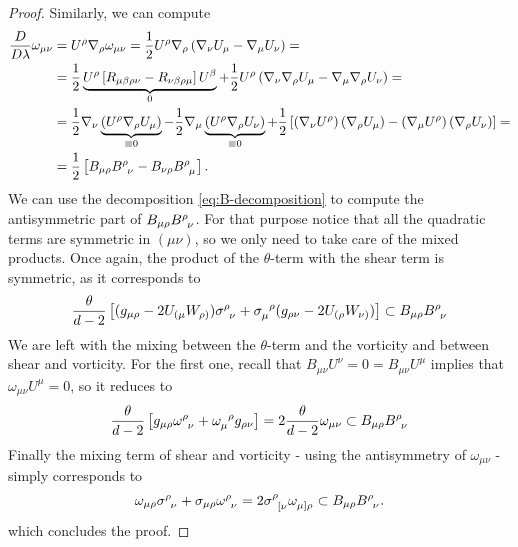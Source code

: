 \begin{proof}
		Similarly, we can compute
		\begin{align*}
			\frac{D}{D\lambda}\omega_{\mu\nu} &= U^{\rho}\nabla_{\rho}\omega_{\mu\nu} = \frac{1}{2}U^{\rho}\nabla_{\rho}\left( \nabla_{\nu}U_{\mu} - \nabla_{\mu}U_{\nu} \right) = \\
		&= \frac{1}{2}\underbrace{U^{\rho} \left[R_{\mu\beta\rho\nu} - R_{\nu\beta\rho\mu}\right]U^{\beta}}_{0} + \frac{1}{2}U^{\rho}\left(\nabla_{\nu}\nabla_{\rho}U_{\mu} - \nabla_{\mu}\nabla_{\rho}U_{\nu}\right) = \\
		&= \frac{1}{2} \nabla_{\nu}\underbrace{\left( U^{\rho} \nabla_{\rho}U_{\mu}\right)}_{\equiv 0} -  \frac{1}{2} \nabla_{\mu}\underbrace{\left( U^{\rho} \nabla_{\rho}U_{\nu}\right)}_{\equiv 0} + \frac{1}{2}\left[\left(\nabla_{\nu}U^{\rho}\right)\left(\nabla_{\rho}U_{\mu}\right) - \left(\nabla_{\mu}U^{\rho}\right)\left(\nabla_{\rho}U_{\nu}\right) \right] =\\
		&= \frac{1}{2} \left[B_{\mu\rho}B\indices{^{\rho}_{\nu}} - B_{\nu\rho}B\indices{^{\rho}_{\mu}} \right].
		\end{align*}
		We can use the decomposition \ref{eq:B-decomposition} to compute the antisymmetric part of \(B_{\mu\rho}B\indices{^{\rho}_{\nu}}\). For that purpose notice that all the quadratic terms are symmetric in \((\mu\nu)\), so we only need to take care of the mixed products. Once again, the product of the \(\theta\)-term with the shear term is symmetric, as it corresponds to
		\[
		\frac{\theta}{d - 2}\left[(g_{\mu\rho} - 2U_{(\mu}W_{\rho)}) \sigma\indices{^{\rho}_{\nu}} + \sigma\indices{_{\mu}^{\rho}}(g_{\rho\nu} - 2U_{(\rho}W_{\nu)})\right] \subset B_{\mu\rho}B\indices{^{\rho}_{\nu}}
		\]
		We are left with the mixing between the \(\theta\)-term and the vorticity and between shear and vorticity. For the first one, recall that \(B_{\mu\nu}U^{\nu} = 0 = B_{\mu\nu}U^{\mu}\) implies that \(\omega_{\mu\nu}U^{\mu} = 0\), so it reduces to
		\[
		\frac{\theta}{d - 2}\left[g_{\mu\rho}\omega\indices{^{\rho}_{\nu}} + \omega\indices{_{\mu}^{\rho}}g_{\rho\nu}\right] = 2 \frac{\theta}{d -2}\omega_{\mu\nu} \subset B_{\mu\rho}B\indices{^{\rho}_{\nu}}
		\]
		Finally the mixing term of shear and vorticity - using the antisymmetry of \(\omega_{\mu\nu}\) - simply corresponds to 
		\[
		\omega_{\mu\rho} \sigma\indices{^{\rho}_{\nu}} + \sigma_{\mu\rho} \omega\indices{^{\rho}_{\nu}} = 2 \sigma\indices{^{\rho}_{[\nu}}\omega\indices{_{\mu]\rho}} \subset B_{\mu\rho}B\indices{^{\rho}_{\nu}}.
		\]
		which concludes the proof.
	\end{proof}
	

